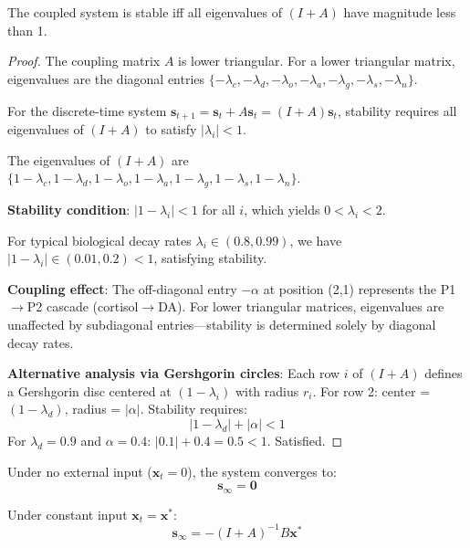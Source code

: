 \documentclass[preprint,12pt]{elsarticle}
\begin{document}
\begin{lemma}
The coupled system is stable iff all eigenvalues of $(I + A)$ have magnitude less than 1.
\end{lemma}

\begin{proof}
The coupling matrix $A$ is lower triangular. For a lower triangular matrix, eigenvalues are the diagonal entries $\{-\lambda_c, -\lambda_d, -\lambda_o, -\lambda_a, -\lambda_g, -\lambda_s, -\lambda_n\}$.

For the discrete-time system $\mathbf{s}_{t+1} = \mathbf{s}_t + A\mathbf{s}_t = (I + A)\mathbf{s}_t$, stability requires all eigenvalues of $(I + A)$ to satisfy $|\lambda_i| < 1$.

The eigenvalues of $(I + A)$ are $\{1-\lambda_c, 1-\lambda_d, 1-\lambda_o, 1-\lambda_a, 1-\lambda_g, 1-\lambda_s, 1-\lambda_n\}$.

\textbf{Stability condition}: $|1 - \lambda_i| < 1$ for all $i$, which yields $0 < \lambda_i < 2$.

For typical biological decay rates $\lambda_i \in (0.8, 0.99)$, we have $|1 - \lambda_i| \in (0.01, 0.2) < 1$, satisfying stability.

\textbf{Coupling effect}: The off-diagonal entry $-\alpha$ at position (2,1) represents the P1$\rightarrow$P2 cascade (cortisol$\rightarrow$DA). For lower triangular matrices, eigenvalues are unaffected by subdiagonal entries---stability is determined solely by diagonal decay rates.

\textbf{Alternative analysis via Gershgorin circles}: Each row $i$ of $(I + A)$ defines a Gershgorin disc centered at $(1-\lambda_i)$ with radius $r_i$. For row 2: center = $(1-\lambda_d)$, radius = $|\alpha|$. Stability requires:
\begin{equation}
|1 - \lambda_d| + |\alpha| < 1
\end{equation}
For $\lambda_d = 0.9$ and $\alpha = 0.4$: $|0.1| + 0.4 = 0.5 < 1$. Satisfied.
\end{proof}

\begin{theorem}
Under no external input ($\mathbf{x}_t = 0$), the system converges to:
\begin{equation}
\mathbf{s}_{\infty} = \mathbf{0}
\end{equation}
\end{theorem}

\begin{corollary}
Under constant input $\mathbf{x}_t = \mathbf{x}^*$:
\begin{equation}
\mathbf{s}_{\infty} = -(I + A)^{-1} B \mathbf{x}^*
\end{equation}
\end{corollary}
\end{document}
